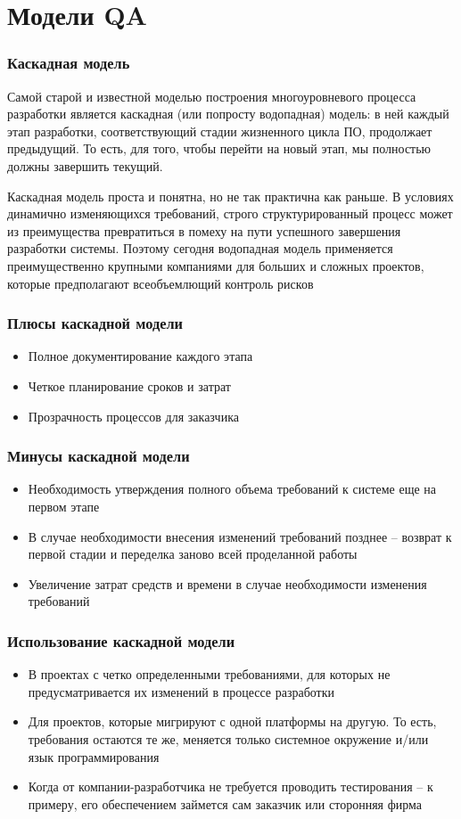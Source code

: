 \documentclass{../industrial-development}
\begin{document}
\section{Модели QA}
\begin{frame} \frametitle{Каскадная модель}
\begin{flushleft}
	Самой старой и известной моделью построения многоуровневого процесса разработки является каскадная (или попросту водопадная) модель: в ней каждый этап разработки, соответствующий стадии жизненного цикла ПО, продолжает предыдущий. То есть, для того, чтобы перейти на новый этап, мы полностью должны завершить текущий.
	
	Каскадная модель проста и понятна, но не так практична как раньше. В условиях динамично изменяющихся требований, строго структурированный процесс может из преимущества превратиться в помеху на пути успешного завершения разработки системы. Поэтому сегодня водопадная модель применяется преимущественно крупными компаниями для больших и сложных проектов, которые предполагают всеобъемлющий контроль рисков
\end{flushleft}
\end{frame}

\begin{frame} \frametitle{Плюсы каскадной модели}
\begin{itemize}
\item Полное документирование каждого этапа
\item Четкое планирование сроков и затрат
\item Прозрачность процессов для заказчика
\end{itemize}
\end{frame}

\begin{frame} \frametitle{Минусы каскадной модели}
\begin{itemize}
	\item Необходимость утверждения полного объема требований к системе еще на первом этапе
	\item В случае необходимости внесения изменений требований позднее – возврат к первой стадии и переделка заново всей проделанной работы
	\item Увеличение затрат средств и времени в случае необходимости изменения требований
\end{itemize}
\end{frame}

\begin{frame} \frametitle{Использование каскадной модели}
\begin{itemize}
	\item В проектах с четко определенными требованиями, для которых не предусматривается их изменений в процессе разработки
	\item Для проектов, которые мигрируют с одной платформы на другую. То есть, требования остаются те же, меняется только системное окружение и/или язык программирования
	\item Когда от компании-разработчика не требуется проводить тестирования – к примеру, его обеспечением займется сам заказчик или сторонняя фирма
\end{itemize}
\end{frame}
\end{document}
